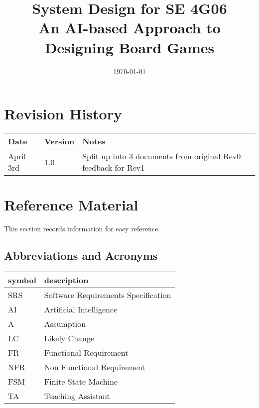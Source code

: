 \documentclass[12pt, titlepage]{article}
\begin{document}
\title{System Design for SE 4G06 \\ An AI-based Approach to Designing Board Games} 
\author{\authname{}}
\date{\today}

\maketitle


\section{Revision History}

\begin{tabularx}{\textwidth}{p{3cm}p{2cm}X}
\toprule {\bf Date} & {\bf Version} & {\bf Notes}\\
\midrule
April 3rd & 1.0 & Split up into 3 documents from original Rev0 feedback for Rev1\\
\bottomrule
\end{tabularx}

\newpage

\section{Reference Material}

This section records information for easy reference.

\subsection{Abbreviations and Acronyms}
\renewcommand{\arraystretch}{1.2}
\begin{tabular}{l l} 
  \toprule		
  \textbf{symbol} & \textbf{description}\\
  \midrule 
  SRS & Software Requirements Specification\\
  AI & Artificial Intelligence \\
  A & Assumption \\
  LC & Likely Change\\
  FR & Functional Requirement \\
  NFR & Non Functional Requirement \\
  FSM & Finite State Machine \\ 
  TA & Teaching Assistant \\
  \bottomrule
\end{tabular}\\
\end{document}
